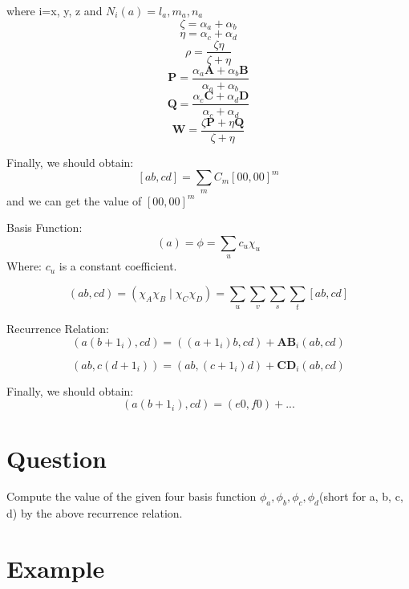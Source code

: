\documentclass{article}
\begin{document}
where i=x, y, z and \( N_i(a)=l_a, m_a, n_a \)
    \[ \zeta=\alpha_a+\alpha_b \]
    \[ \eta =\alpha_c+\alpha_d \]
    \[ \rho = \frac{\zeta\eta}{\zeta+\eta} \]
    \[ \mathbf{P} = \frac{\alpha_a \mathbf{A} + \alpha_b\mathbf{B}}{\alpha_a + \alpha_b} \]
    \[ \mathbf{Q} = \frac{\alpha_c \mathbf{C} + \alpha_d\mathbf{D}}{\alpha_c + \alpha_d} \]
    \[ \mathbf{W} = \frac{\zeta \mathbf{P} + \eta\mathbf{Q}}{\zeta + \eta} \]


Finally, we should obtain:
    \[ [ab,cd] = \sum_mC_m[00,00]^m \]
and we can get the value of \( [00,00]^m \)

Basis Function:
\begin{equation}
    (a)=\phi=\sum_u c_u\chi_u
\end{equation}
Where:  \(c_u\) is a constant coefficient.


\begin{equation}
    (ab,cd)=(\chi_A\chi_B\mid\chi_C\chi_D)=\sum_u\sum_v\sum_s\sum_t[ab,cd]
\end{equation}

Recurrence Relation:
\begin{equation}
    (a(b+1_i),cd)=((a+1_i)b,cd)+\mathbf{AB}_i(ab,cd)
\end{equation}

\begin{equation}
    (ab,c(d+1_i))=(ab,(c+1_i)d)+\mathbf{CD}_i(ab,cd)
\end{equation}


Finally, we should obtain:
\[(a(b+1_i),cd) = (e0,f0)+...\]

\section{Question}
Compute the value of the given four basis function \( \phi_a, \phi_b, \phi_c, \phi_d \)(short for a, b, c, d) by the above recurrence relation.


\section{Example}
\end{document}
